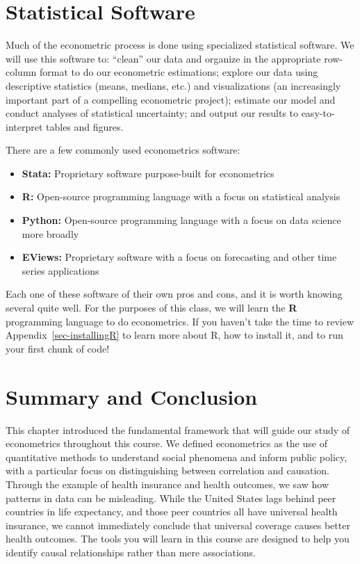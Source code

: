\documentclass[
  letterpaper,
  DIV=11,
  numbers=noendperiod]{scrreprt}
\providecommand{\tightlist}{%
  \setlength{\itemsep}{0pt}\setlength{\parskip}{0pt}}
\begin{document}
\section{Statistical Software}\label{statistical-software-1}

Much of the econometric process is done using specialized statistical
software. We will use this software to: ``clean'' our data and organize
in the appropriate row-column format to do our econometric estimations;
explore our data using descriptive statistics (means, medians, etc.) and
visualizations (an increasingly important part of a compelling
econometric project); estimate our model and conduct analyses of
statistical uncertainty; and output our results to easy-to-interpret
tables and figures.

There are a few commonly used econometrics software:

\begin{itemize}
\tightlist
\item
  \textbf{Stata:} Proprietary software purpose-built for econometrics
\item
  \textbf{R:} Open-source programming language with a focus on
  statistical analysis
\item
  \textbf{Python:} Open-source programming language with a focus on data
  science more broadly
\item
  \textbf{EViews:} Proprietary software with a focus on forecasting and
  other time series applications
\end{itemize}

Each one of these software of their own pros and cons, and it is worth
knowing several quite well. For the purposes of this class, we will
learn the \textbf{R} programming language to do econometrics. If you
haven't take the time to review Appendix~\ref{sec-installingR} to learn
more about R, how to install it, and to run your first chunk of code!

\section{Summary and Conclusion}\label{summary-and-conclusion}

This chapter introduced the fundamental framework that will guide our
study of econometrics throughout this course. We defined econometrics as
the use of quantitative methods to understand social phenomena and
inform public policy, with a particular focus on distinguishing between
correlation and causation. Through the example of health insurance and
health outcomes, we saw how patterns in data can be misleading. While
the United States lags behind peer countries in life expectancy, and
those peer countries all have universal health insurance, we cannot
immediately conclude that universal coverage causes better health
outcomes. The tools you will learn in this course are designed to help
you identify causal relationships rather than mere associations.
\end{document}

